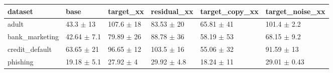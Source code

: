 \begin{tabular}{llllll}
\toprule
dataset & base & target\_xx & residual\_xx & target\_copy\_xx & target\_noise\_xx \\
\midrule
adult & 43.3 $\pm$ 13 & 107.6 $\pm$ 18 & 83.53 $\pm$ 20 & 65.81 $\pm$ 41 & 101.4 $\pm$ 2.2 \\
bank\_marketing & 42.64 $\pm$ 7.1 & 79.89 $\pm$ 26 & 88.78 $\pm$ 36 & 58.19 $\pm$ 53 & 68.15 $\pm$ 9.2 \\
credit\_default & 63.65 $\pm$ 21 & 96.65 $\pm$ 12 & 103.5 $\pm$ 16 & 55.06 $\pm$ 32 & 91.59 $\pm$ 13 \\
phishing & 19.18 $\pm$ 5.1 & 27.92 $\pm$ 4 & 29.92 $\pm$ 4.8 & 18.24 $\pm$ 11 & 29.01 $\pm$ 0.43 \\
\bottomrule
\end{tabular}

